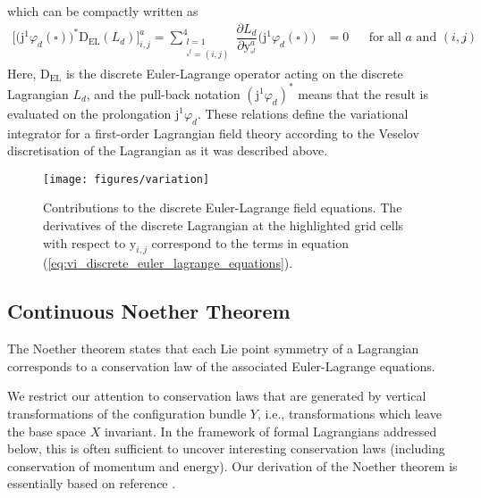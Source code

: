 \documentclass[12pt,a4paper,reqno]{article}
\begin{document}
which can be compactly written as
\begin{align}\label{eq:vi_discrete_euler_lagrange_equations_compact}
\big[ \big( {\ensuremath{\mathrm{j}}}^{1} {\ensuremath{\varphi}}_{d} (\square) \big)^{*} {\ensuremath{\mathrm{D_{EL}}}}(L_{d}) \big]_{i,j}^{a} =
\sum \limits_{\substack{l=1\\ \square^{l} = (i,j)}}^{4} \dfrac{\partial L_{d}}{\partial {\ensuremath{{\ensuremath{\mathrm{{y}}}}}}_{\square^l}^{a}} \big( {\ensuremath{\mathrm{j}}}^{1} {\ensuremath{\varphi}}_{d} (\square) \big) &= 0 &
& \text{for all $a$ and $(i,j)$} .
\end{align}
Here, ${\ensuremath{\mathrm{D_{EL}}}}$ is the discrete Euler-Lagrange operator acting on the discrete Lagrangian $L_{d}$, and the pull-back notation $({\ensuremath{\mathrm{j}}}^{1} {\ensuremath{\varphi}}_{d})^{*}$ means that the result is evaluated on the prolongation ${\ensuremath{\mathrm{j}}}^{1} {\ensuremath{\varphi}}_{d}$.
These relations define the variational integrator for a first-order Lagrangian field theory according to the Veselov discretisation of the Lagrangian as it was described above.

\begin{figure}[tb]
	\centering
	\texttt{[image: figures/variation]}
	\caption{Contributions to the discrete Euler-Lagrange field equations. The derivatives of the discrete Lagrangian at the highlighted grid cells with respect to ${\ensuremath{{\ensuremath{\mathrm{{y}}}}}}_{i,j}$ correspond to the terms in equation (\ref{eq:vi_discrete_euler_lagrange_equations}).}
	\label{fig:variation}
\end{figure}

\subsection{Continuous Noether Theorem}
\label{sec:vi_continous_noether_theorem}

The Noether theorem \cite{Noether:1918, KosmannSchwarzbach:2010}
states that each Lie point symmetry of a Lagrangian corresponds to a conservation law of the associated Euler-Lagrange equations.

We restrict our attention to conservation laws that are generated by vertical transformations of the configuration bundle $Y$, i.e., transformations which leave the base space $X$ invariant.
In the framework of formal Lagrangians addressed below, this is often sufficient to uncover interesting conservation laws (including conservation of momentum and energy).
Our derivation of the Noether theorem is essentially based on reference \citep{MarsdenPatrick:1998}.
\end{document}
